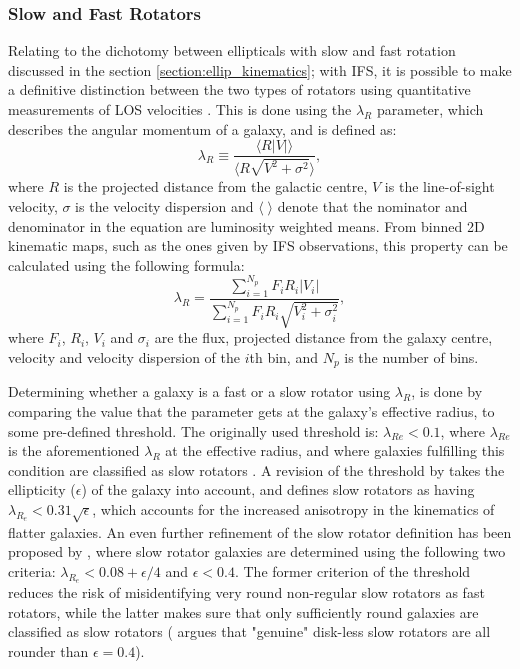 \documentclass[english, oneside]{HYgradu}
\begin{document}
\subsubsection{Slow and Fast Rotators}

Relating to the dichotomy between ellipticals with slow and fast rotation discussed in the section \ref{section:ellip_kinematics}; with IFS, it is possible to make a definitive distinction between the two types of rotators using quantitative measurements of LOS velocities \citep{Emsellem2007}. This is done using the $\lambda_R$ parameter, which describes the angular momentum of a galaxy, and is defined as:  
\begin{equation}
\lambda_R \equiv \frac{\langle R |V| \rangle}{\langle R \sqrt{V^2 + \sigma^2} \rangle}, \label{eq:general_lambdar}
\end{equation}
where $R$ is the projected distance from the galactic centre, $V$ is the line-of-sight velocity, $\sigma$ is the velocity dispersion and $\langle \; \rangle$ denote that the nominator and denominator in the equation are luminosity weighted means. From binned 2D kinematic maps, such as the ones given by IFS observations, this property can be calculated using the following formula:
\begin{equation}
\lambda_R = \frac{\sum^{N_p}_{i=1} F_i R_i |V_i|}{\sum^{N_p}_{i=1} F_i R_i \sqrt{V_i^2 + \sigma^2_i}}, \label{eq:binned_lambdar}
\end{equation}
where $F_i$, $R_i$, $V_i$ and $\sigma_i$ are the flux, projected distance from the galaxy centre, velocity and velocity dispersion of the $i$th bin, and $N_p$ is the number of bins.

Determining whether a galaxy is a fast or a slow rotator using $\lambda_R$, is done by comparing the value that the parameter gets at the galaxy's effective radius, to some pre-defined threshold. The originally used threshold is: $\lambda_{Re} < 0.1$, where $\lambda_{Re}$ is the aforementioned $\lambda_R$ at the effective radius, and where galaxies fulfilling this condition are classified as slow rotators \citep{Emsellem2007}. A revision of the threshold by \cite{Emsellem2011} takes the ellipticity ($\epsilon$) of the galaxy into account, and defines slow rotators as having $\lambda_{R_e} < 0.31 \sqrt{\epsilon}$, which accounts for the increased anisotropy in the kinematics of flatter galaxies. An even further refinement of the slow rotator definition has been proposed by \cite{Cappellari2016}, where slow rotator galaxies are determined using the following two criteria: $\lambda_{R_e} < 0.08 + \epsilon/4$ and $\epsilon < 0.4$. The former criterion of the threshold reduces the risk of misidentifying very round non-regular slow rotators as fast rotators, while the latter makes sure that only sufficiently round galaxies are classified as slow rotators (\citealt{Cappellari2016} argues that "genuine" disk-less slow rotators are all rounder than $\epsilon = 0.4$).
\end{document}
